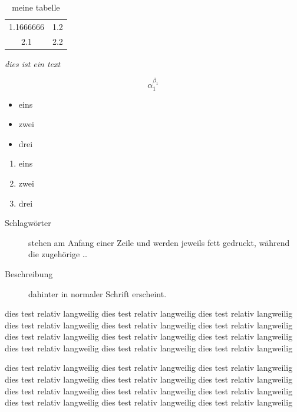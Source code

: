 \documentclass{scrartcl}
\begin{document}
\vspace{2ex}

\begin{table}	
\caption{meine tabelle}\label{tab:meine-tabelle}
\centering
\begin{tabular}{|cc}
    \hline
	1.1666666 & 1.2 \\
	2.1 & 2.2 \\
\end{tabular}	
\end{table}

\emph{dies \emph{ist} ein text}

\mdseries


\begin{equation*}
    \alpha_1^{\beta_1}
\end{equation*}

\clearpage

\begin{itemize}
    \item eins
    \item zwei
    \item drei
\end{itemize}

\begin{enumerate}
    \item eins
    \item zwei
    \item drei
\end{enumerate}

\begin{description}
    \item[Schlagwörter] stehen
    am Anfang einer Zeile und
    werden jeweils fett gedruckt,
    während die zugehörige \ldots
    \item[Beschreibung]
    dahinter in normaler Schrift
    erscheint. 
\end{description}


dies test relativ langweilig dies test relativ langweilig dies test relativ langweilig dies test relativ langweilig dies test relativ langweilig dies test relativ langweilig dies test relativ langweilig dies test relativ langweilig dies test relativ langweilig dies test relativ langweilig dies test relativ langweilig dies test relativ langweilig 

\noindent dies test relativ langweilig dies test relativ langweilig dies test relativ langweilig dies test relativ langweilig dies test relativ langweilig dies test relativ langweilig dies test relativ langweilig dies test relativ langweilig dies test relativ langweilig dies test relativ langweilig dies test relativ langweilig dies test relativ langweilig 
\end{document}
